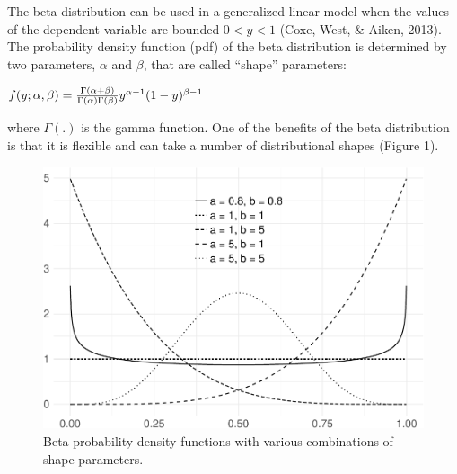 \documentclass[english,man]{apa6}
\theoremstyle{definition}
\theoremstyle{definition}
\theoremstyle{remark}
\begin{document}
The beta distribution can be used in a generalized linear model when the
values of the dependent variable are bounded \(0 < y < 1\) (Coxe, West,
\& Aiken, 2013). The probability density function (pdf) of the beta
distribution is determined by two parameters, \(\alpha\) and \(\beta\),
that are called \enquote{shape} parameters:

\begin{center}
$f(y;\alpha,\beta)={\Gamma(\alpha+\beta)\over\Gamma(\alpha)\Gamma(\beta)}y^{\alpha-1}(1-y)^{\beta-1}$
\end{center}

where \(\Gamma(.)\) is the gamma function. One of the benefits of the
beta distribution is that it is flexible and can take a number of
distributional shapes (Figure 1).

\begin{figure}
\centering
\includegraphics{beta_hurdle_files/figure-latex/unnamed-chunk-2-1.pdf}
\caption{\label{fig:unnamed-chunk-2}Beta probability density functions with
various combinations of shape parameters.}
\end{figure}
\end{document}
